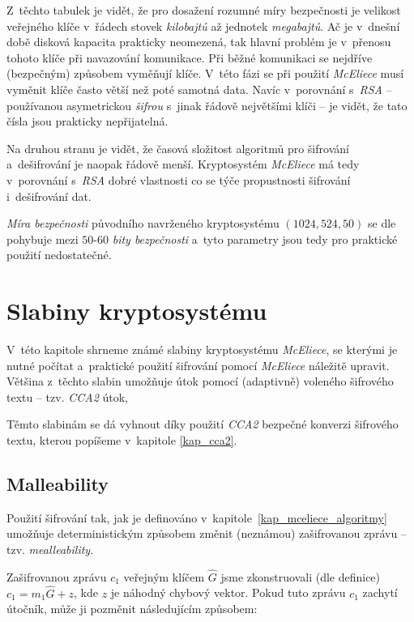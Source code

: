 \documentclass[thesis=M,czech,hidelinks]{FITthesis}[2012/06/26]
\newcommand{\0}{{\textcolor[gray]{0.75}{0}}}
\begin{document}
Z~těchto tabulek je vidět, že pro dosažení rozumné míry bezpečnosti je velikost
veřejného klíče v~řádech stovek \emph{kilobajtů} až jednotek \emph{megabajtů}.
Ač je v~dnešní době disková kapacita prakticky neomezená, tak hlavní problém je
v~přenosu tohoto klíče při navazování komunikace. Při běžné komunikaci se
nejdříve (bezpečným) způsobem vyměňují klíče. V~této fázi se při použití
\emph{McEliece} musí vyměnit klíče často větší než poté samotná data. Navíc
v~porovnání s~\emph{RSA} -- používanou asymetrickou \emph{šifrou} s~jinak řádově
největšími klíči -- je vidět, že tato čísla jsou prakticky nepřijatelná.

Na druhou stranu je vidět, že časová složitost algoritmů pro šifrování
a~dešifrování je naopak řádově menší. Kryptosystém \emph{McEliece} má tedy
v~porovnání s~\emph{RSA} dobré vlastnosti co se týče propustnosti šifrování
i~dešifrování dat.

\emph{Míra bezpečnosti} původního navrženého kryptosystému
$\left(1024,524,50\right)$ se dle~\cite{Canteaut,Repka} pohybuje mezi $50$-$60$
\emph{bity bezpečnosti} a~tyto parametry jsou tedy pro praktické použití
nedostatečné.



\section{Slabiny kryptosystému}\label{kap_slabiny}

V~této kapitole shrneme známé slabiny kryptosystému \emph{McEliece}, se
kterými je nutné počítat a~praktické použití šifrování pomocí \emph{McEliece}
náležitě upravit. Většina z~těchto slabin umožňuje útok pomocí (adaptivně)
voleného šifrového textu -- tzv. \emph{CCA2} útok,

Těmto slabinám se dá vyhnout díky použití \emph{CCA2} bezpečné konverzi
šifrového textu, kterou popíšeme v~kapitole \ref{kap_cca2}.


\subsection{Malleability}

Použití šifrování tak, jak je definováno v~kapitole~\ref{kap_mceliece_algoritmy}
umožňuje deterministickým způsobem změnit (neznámou) zašifrovanou zprávu -- tzv.
\emph{mealleability}.

Zašifrovanou zprávu $c_1$ veřejným klíčem $\hat{G}$ jsme zkonstruovali (dle
definice) $c_1 = m_1\hat{G} + z$, kde $z$ je náhodný chybový vektor. Pokud
tuto zprávu $c_1$ zachytí útočník, může ji pozměnit následujícím způsobem:
\end{document}
